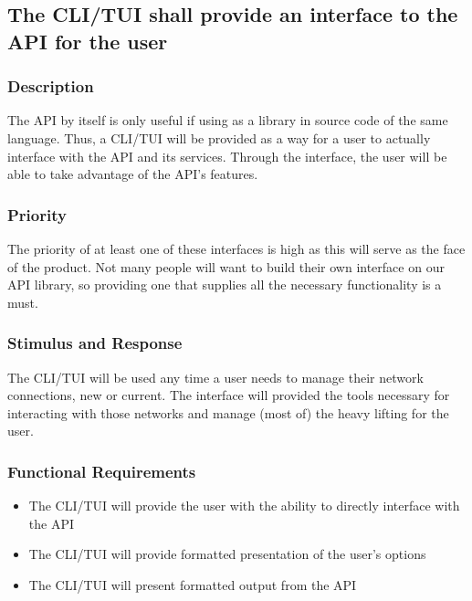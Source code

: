 
\subsection{The CLI/TUI shall provide an interface to the API for the user}
\subsubsection{Description}
The API by itself is only useful if using as a library in source code of the
same language. Thus, a CLI/TUI will be provided as a way for a user to actually
interface with the API and its services. Through the interface, the user will be
able to take advantage of the API's features.

\subsubsection{Priority}
The priority of at least one of these interfaces is high as this will serve as the 
face of the product. Not many people will want to build their own interface on our
API library, so providing one that supplies all the necessary functionality is a must.

\subsubsection{Stimulus and Response}
The CLI/TUI will be used any time a user needs to manage their network connections,
new or current. The interface will provided the tools necessary for interacting with
those networks and manage (most of) the heavy lifting for the user.

\subsubsection{Functional Requirements}
\begin{itemize}
    \item The CLI/TUI will provide the user with the ability to directly interface
      with the API
    \item The CLI/TUI will provide formatted presentation of the user's options
    \item The CLI/TUI will present formatted output from the API
\end{itemize}
